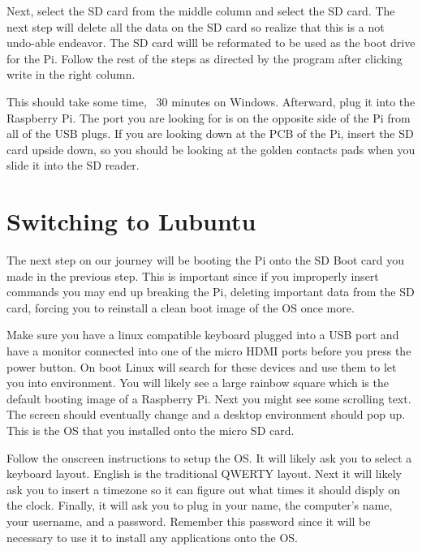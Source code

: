 \documentclass[letterpaper,12pt,notitlepage]{report} %
\begin{document}
Next, select the SD card from the middle column and select the SD card. The next step will delete all the data on the SD card so realize that this is a not undo-able endeavor. The SD card willl be reformated to be used as the boot drive for the Pi. Follow the rest of the steps as directed by the program after clicking write in the right column. 

This should take some time, ~30 minutes on Windows. Afterward, plug it into the Raspberry Pi. The port you are looking for is on the opposite side of the Pi from all of the USB plugs. If you are looking down at the PCB of the Pi, insert the SD card upside down, so you should be looking at the golden contacts pads when you slide it into the SD reader. 

\section{Switching to Lubuntu}
The next step on our journey will be booting the Pi onto the SD Boot card you made in the previous step. This is important since if you improperly insert commands you may end up breaking the Pi, deleting important data from the SD card, forcing you to reinstall a clean boot image of the OS once more.

Make sure you have a linux compatible keyboard plugged into a USB port and have a monitor connected into one of the micro HDMI ports before you press the power button. On boot Linux will search for these devices and use them to let you into environment. You will likely see a large rainbow square which is the default booting image of a Raspberry Pi. Next you might see some scrolling text. The screen should eventually change and a desktop environment should pop up. This is the OS that you installed onto the micro SD card. 

Follow the onscreen instructions to setup the OS. It will likely ask you to select a keyboard layout. English is the traditional QWERTY layout. Next it will likely ask you to insert a timezone so it can figure out what times it should disply on the clock. Finally, it will ask you to plug in your name, the computer's name, your username, and a password. Remember this password since it will be necessary to use it to install any applications onto the OS.
\end{document}
